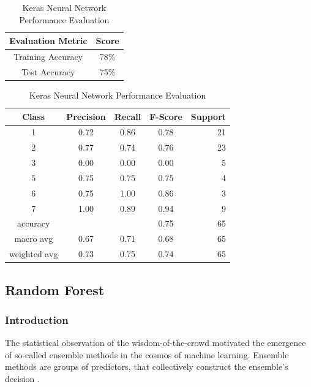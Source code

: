 \begin{table}[!ht]
\begin{subtable}[c]{0.4\textwidth}
\footnotesize
\centering
\begin{tabular}{ c | c }
 \toprule
 Evaluation Metric & Score  \\
 \midrule 
 Training Accuracy & 78\% \\
 Test Accuracy & 75\% \\
 \bottomrule
\end{tabular}
\captionsetup{justification=centering,margin=1cm}
\end{subtable}
\begin{subtable}[c]{0.6\textwidth}
\footnotesize
\centering
\begin{tabular}{c | c c c r}
Class & Precision & Recall & F-Score & Support\\
\midrule
1   &    0.72   &   0.86  &    0.78  &      21 \\
2   &    0.77   &   0.74  &    0.76  &      23 \\
3   &    0.00   &   0.00  &    0.00  &       5 \\
5   &    0.75   &   0.75  &    0.75  &       4 \\
6   &    0.75   &   1.00  &    0.86  &       3 \\
7   &    1.00   &   0.89  &    0.94  &       9 \\
\midrule
    accuracy   &           &         &    0.75   &     65 \\
   macro avg   &    0.67   &   0.71  &    0.68   &     65 \\
weighted avg   &    0.73   &   0.75  &    0.74   &     65 \\
\end{tabular}
\captionsetup{justification=centering,margin=1cm}
\end{subtable}
\caption{Keras Neural Network Performance Evaluation}
\label{keras_nn_evaluation}
\end{table}

\subsection{Random Forest}
\subsubsection{Introduction}
The statistical observation of the wisdom-of-the-crowd motivated the emergence of so-called ensemble methods in the cosmos of machine learning. Ensemble methods are groups of predictors, that collectively construct the ensemble's decision \cite{introStats}. 

